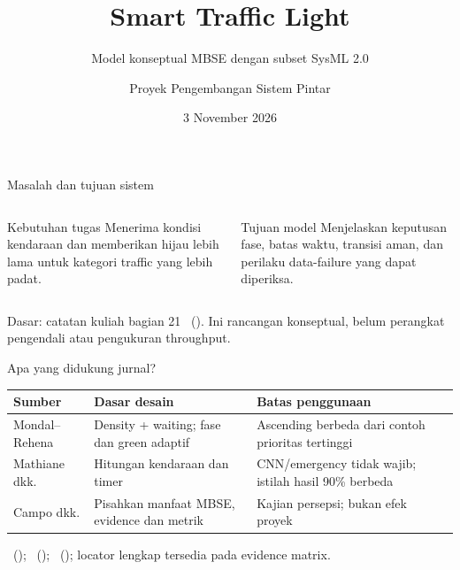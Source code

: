 \documentclass[aspectratio=169,11pt]{beamer}
\title{Smart Traffic Light}
\subtitle{Model konseptual MBSE dengan subset SysML 2.0}
\author{Proyek Pengembangan Sistem Pintar}
\date{3 November 2026}
\begin{document}
\begin{frame}\titlepage\end{frame}

\begin{frame}{Masalah dan tujuan sistem}
\begin{columns}[T]
\begin{block}{Kebutuhan tugas}
Menerima kondisi kendaraan dan memberikan hijau lebih lama untuk kategori traffic yang lebih padat.
\end{block}
\begin{block}{Tujuan model}
Menjelaskan keputusan fase, batas waktu, transisi aman, dan perilaku data-failure yang dapat diperiksa.
\end{block}
\end{columns}
\vspace{5mm}\small Dasar: catatan kuliah bagian 21 \citeauthor{lecture02}~(\citeyear{lecture02}). Ini rancangan konseptual, belum perangkat pengendali atau pengukuran throughput.
\end{frame}

\begin{frame}{Apa yang didukung jurnal?}
\small
\begin{tabular}{>{\raggedright\arraybackslash}p{.25\linewidth}>{\raggedright\arraybackslash}p{.34\linewidth}>{\raggedright\arraybackslash}p{.31\linewidth}}
\toprule Sumber & Dasar desain & Batas penggunaan \\\midrule
Mondal--Rehena & Density + waiting; fase dan green adaptif & Ascending berbeda dari contoh prioritas tertinggi \\[3mm]
Mathiane dkk. & Hitungan kendaraan dan timer & CNN/emergency tidak wajib; istilah hasil 90\% berbeda \\[3mm]
Campo dkk. & Pisahkan manfaat MBSE, evidence dan metrik & Kajian persepsi; bukan efek proyek \\\bottomrule
\end{tabular}
\vfill\scriptsize \citeauthor{mondal2022}~(\citeyear{mondal2022}); \citeauthor{mathiane2023}~(\citeyear{mathiane2023}); \citeauthor{campo2023}~(\citeyear{campo2023}); locator lengkap tersedia pada evidence matrix.
\end{frame}
\end{document}

